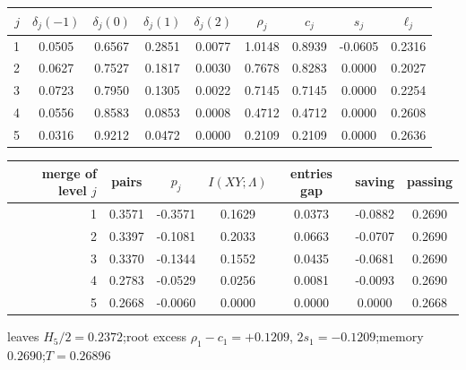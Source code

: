 \begin{tabular}{rcccccccc}
\toprule
$j$ & $\delta_j(-1)$ & $\delta_j(0)$ & $\delta_j(1)$ & $\delta_j(2)$ & $\rho_j$ & $c_j$ & $s_j$ & $\ell_j$ \\
\midrule
1 & 0.0505 & 0.6567 & 0.2851 & 0.0077 & 1.0148 & 0.8939 & -0.0605 & 0.2316 \\
2 & 0.0627 & 0.7527 & 0.1817 & 0.0030 & 0.7678 & 0.8283 & 0.0000 & 0.2027 \\
3 & 0.0723 & 0.7950 & 0.1305 & 0.0022 & 0.7145 & 0.7145 & 0.0000 & 0.2254 \\
4 & 0.0556 & 0.8583 & 0.0853 & 0.0008 & 0.4712 & 0.4712 & 0.0000 & 0.2608 \\
5 & 0.0316 & 0.9212 & 0.0472 & 0.0000 & 0.2109 & 0.2109 & 0.0000 & 0.2636 \\
\bottomrule
\end{tabular}

\medskip

\begin{tabular}{rcccccc}
\toprule
merge of level $j$ & pairs & $p_j$ & $I(XY;\Lambda)$ & entries gap & saving & passing \\
\midrule
1 & 0.3571 & -0.3571 & 0.1629 & 0.0373 & -0.0882 & 0.2690 \\
2 & 0.3397 & -0.1081 & 0.2033 & 0.0663 & -0.0707 & 0.2690 \\
3 & 0.3370 & -0.1344 & 0.1552 & 0.0435 & -0.0681 & 0.2690 \\
4 & 0.2783 & -0.0529 & 0.0256 & 0.0081 & -0.0093 & 0.2690 \\
5 & 0.2668 & -0.0060 & 0.0000 & 0.0000 & 0.0000 & 0.2668 \\
\bottomrule
\end{tabular}

\smallskip
{\footnotesize leaves $H_5/2 = 0.2372$;\quad root excess $\rho_1-c_1 = +0.1209$, $2s_1 = -0.1209$;\quad memory $0.2690$;\quad $T = 0.26896$}
